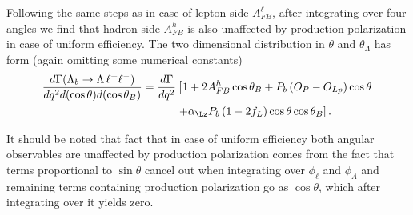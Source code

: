 Following the same steps as in case of lepton side $A_{FB}^\ell$, after integrating over four angles we
find that hadron side $A_{FB}^h$ is also unaffected by production polarization in case of uniform
efficiency. The two dimensional distribution in $\theta$ and $\theta_\Lambda$ has form (again omitting some
numerical constants)
\begin{align}
\frac{d\Gamma(\Lambda_{b}\to \Lambda \,\ell^{+}\ell^{-})}{dq^2d(\cos\theta) d(\cos\theta_B)}=
\frac{d\Gamma}{dq^2}&\left[1+2A_{FB}^h\cos\theta_B+P_b\left(O_P-O_{Lp}\right)\cos\theta\right.\nonumber \\
&\left.+\alpha_\Lz P_b\left(1-2f_L\right)\cos\theta\cos\theta_B\right].
\label{eq:hadron2D}
\end{align}

It should be noted that fact that in case of uniform efficiency both angular observables are
unaffected by production polarization comes from the fact that terms proportional to $\sin\theta$
cancel out when integrating over $\phi_\ell$ and $\phi_\Lambda$ and remaining terms containing production
polarization go as $\cos\theta$, which after integrating over it yields zero.


